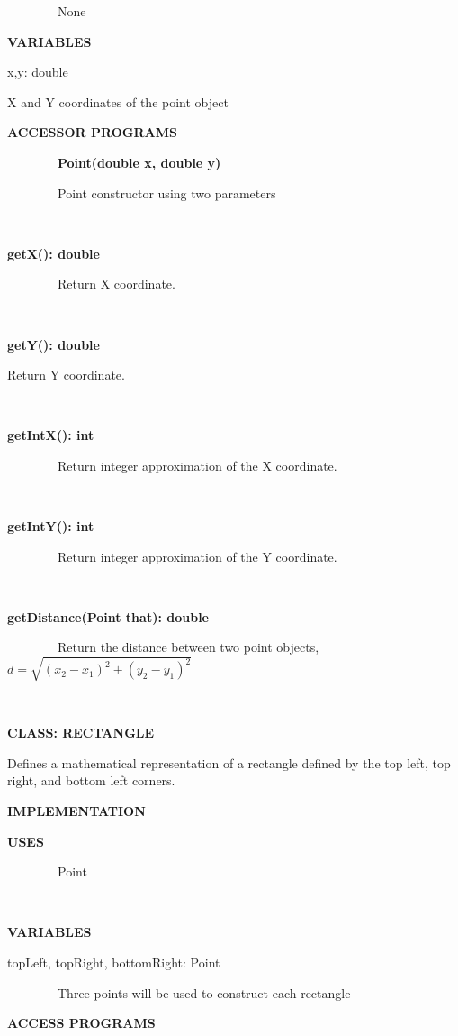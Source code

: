 \documentclass{article}
\begin{document}
{{~~~~~~~~None}

{\textbf{VARIABLES}}

{x,y: double}

{X and Y coordinates of the point object}

{\textbf{ACCESSOR PROGRAMS}}

{~~~~~~~~\textbf{Point(double x, double y)}}

{~~~~~~~~Point constructor using two parameters}

{~~~~~~~~~~~~~~~~}

{\textbf{getX(): double}}

{~~~~~~~~Return X coordinate.}

{~~~~~~~~~~~~~~~~}

{\textbf{getY(): double}}

{Return Y coordinate.}

{~~~~~~~~~~~~~~~~}

{\textbf{getIntX(): int}}

{~~~~~~~~Return integer approximation of the X coordinate.}

{~~~~~~~~~~~~~~~~}

{\textbf{getIntY(): int}}

{~~~~~~~~Return integer approximation of the Y coordinate.}

{~~~~~~~~~~~~~~~~}

{\textbf{getDistance(Point that): double}}

{~~~~~~~~Return the distance between two point objects, \(d=\sqrt{(x_{2} - x_{1})^{2} + (y_{2} - y_{1})^{2}}\)}

{~~~~~~~~}

{}

{\textbf{CLASS: RECTANGLE}}

{Defines a mathematical representation of a rectangle defined by the top
left, top right, and bottom left corners.}

{}

{\textbf{IMPLEMENTATION}}

{\textbf{USES}}

{~~~~~~~~Point}

{~~~~~~~~}

{\textbf{VARIABLES}}

{topLeft, topRight, bottomRight: Point}

{~~~~~~~~Three points will be used to construct each rectangle}

{}

{\textbf{ACCESS PROGRAMS}}

}
\end{document}

